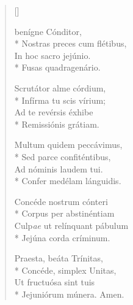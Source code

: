 \newHymn
{}


\begin{verse}[\versewidth]

 benígne Cónditor,\\*
Nostras preces cum flétibus,\\
In hoc sacro jejúnio.\\*
Fusas quadragenário. 

\pointtrans

Scrutátor alme córdium,\\*
Infírma tu scis vírium;\\
Ad te revérsis éxhibe\\*
Remissiónis grátiam. 

Multum quidem peccávimus,\\*
Sed parce confiténtibus,\\
Ad nóminis laudem tui.\\*
Confer medélam lánguidis. 

Concéde nostrum cónteri\\*
Corpus per abstinéntiam\\
Culp\emph{ae} ut relínquant pábulum\\*
Jejúna corda críminum.

Praesta, beáta Trínitas,\\*
Concéde, simplex Unitas,\\
Ut fructuósa sint tuis\\*
Jejuniórum múnera. Amen.

\end{verse}


